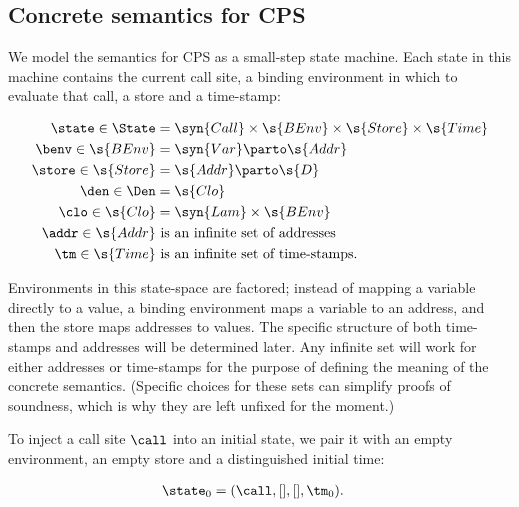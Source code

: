 \subsection{Concrete semantics for CPS}
We model the semantics for CPS as a small-step state machine.
Each state in this machine contains the current call site, a binding
environment in which to evaluate that call, a store and a time-stamp:
\begin{small}\begin{align*}
  \state \in \State &=
  \syn{Call} \times 
  \s{BEnv} \times 
  \s{Store} \times
  \s{Time}
  \\
  \benv \in \s{BEnv} &= \syn{Var} \parto \s{Addr} 
  \\
  \store \in \s{Store} &= \s{Addr} \parto \s{D}
  \\
  \den \in \Den &= \s{Clo}
  \\
  \clo \in \s{Clo} &= \syn{Lam} \times \s{BEnv}
  \\
  \addr \in \s{Addr} &\text{ is an infinite set of addresses}
  \\
  \tm \in \s{Time} &\text{ is an infinite set of time-stamps}
  \text.
\end{align*}\end{small}Environments in this state-space are factored; instead of mapping a
variable directly to a value, a binding environment maps a variable to
an address, and then the store maps addresses to values.
The specific structure of both time-stamps and addresses will be
determined later.
Any infinite set will work for either addresses or time-stamps for the
purpose of defining the meaning of the concrete semantics.
(Specific choices for these sets can simplify proofs of soundness,
which is why they are left unfixed for the moment.)



To inject a call site $\call$ into an initial state, we pair it with an empty
environment, an empty store and a distinguished initial time:
\begin{small}\begin{align*}
  \state_0 &= (\call, [], [], \tm_0)
  \text.
\end{align*}\end{small}



